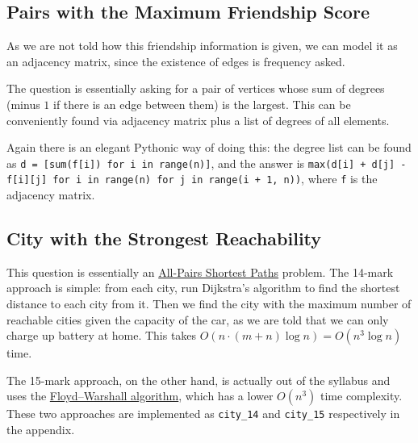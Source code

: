 \documentclass[12pt]{article}
\renewcommand{\t}{\texttt}
\begin{document}
\subsection{Pairs with the Maximum Friendship Score}
As we are not told how this friendship information is given, we can model it as an adjacency matrix, since the existence of edges is frequency asked.

The question is essentially asking for a pair of vertices whose sum of degrees (minus $1$ if there is an edge between them) is the largest. This can be conveniently found via adjacency matrix plus a list of degrees of all elements.

Again there is an elegant Pythonic way of doing this: the degree list can be found as \t{d = [sum(f[i]) for i in range(n)]}, and the answer is \t{max(d[i] + d[j] - f[i][j] for i in range(n) for j in range(i + 1, n))}, where \t{f} is the adjacency matrix.
\subsection{City with the Strongest Reachability}
This question is essentially an \href{https://en.wikipedia.org/wiki/Shortest_path_problem#All-pairs_shortest_paths}{All-Pairs Shortest Paths} problem. The 14-mark approach is simple: from each city, run Dijkstra's algorithm to find the shortest distance to each city from it. Then we find the city with the maximum number of reachable cities given the capacity of the car, as we are told that we can only charge up battery at home. This takes $O(n\cdot(m+n)\log n)=O\left(n^3\log n\right)$ time.

The 15-mark approach, on the other hand, is actually out of the syllabus and uses the \href{https://en.wikipedia.org/wiki/Floyd%E2%80%93Warshall_algorithm}{Floyd–Warshall algorithm}, which has a lower $O\left(n^3\right)$ time complexity. These two approaches are implemented as \t{city\_14} and \t{city\_15} respectively in the appendix.
\end{document}
